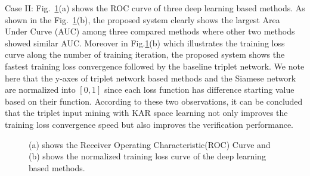 \documentclass[runningheads]{llncs}
\begin{document}
Case II: Fig.~\ref{fig2}(a) shows the ROC curve of three deep learning based methods. As shown in the Fig.~\ref{fig2}(b), the proposed system clearly shows the largest Area Under Curve (AUC) among three compared methods where other two methods showed similar AUC. Moreover in Fig.\ref{fig2}(b) which illustrates the training loss curve along the number of training iteration, the proposed system shows the fastest training loss convergence followed by the baseline triplet network. We note here that the y-axes of triplet network based methods and the Siamese network are normalized into $[0,1]$ since each loss function has difference starting value based on their function. According to these two observations, it can be concluded that the triplet input mining with KAR space learning not only improves the training loss convergence speed but also improves the verification performance.

\begin{figure}[!ht]
    \begin{center}
    \caption{(a) shows the Receiver Operating Characteristic(ROC) Curve and 
    (b) shows the normalized training loss curve of the deep learning based methods. }
    \label{fig2}
    \end{center}
 \end{figure}
\end{document}
